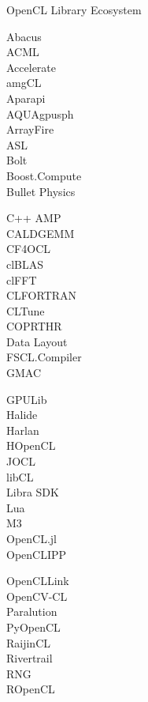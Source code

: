 \begin{frame}{OpenCL Library Ecosystem}

 \begin{minipage}{0.19\textwidth}
Abacus\\
ACML\\
Accelerate\\
amgCL\\
Aparapi\\
AQUAgpusph\\
ArrayFire\\
ASL\\
Bolt\\
Boost.Compute\\
Bullet Physics\\
 \end{minipage}
 \begin{minipage}{0.19\textwidth}
C++ AMP\\
CALDGEMM\\
CF4OCL\\
clBLAS\\
clFFT\\
CLFORTRAN\\
CLTune\\
COPRTHR\\
Data Layout\\
FSCL.Compiler\\
GMAC\\
 \end{minipage}
  \begin{minipage}{0.2\textwidth}
GPULib\\
Halide\\
Harlan\\
HOpenCL\\
JOCL\\
libCL\\
Libra SDK\\
Lua\\
M3\\
OpenCL.jl\\
OpenCLIPP\\
 \end{minipage}
  \begin{minipage}{0.20\textwidth}
OpenCLLink\\
OpenCV-CL\\
Paralution\\
PyOpenCL\\
RaijinCL\\
Rivertrail\\
RNG\\
ROpenCL\\

\end{minipage}
\end{frame}
